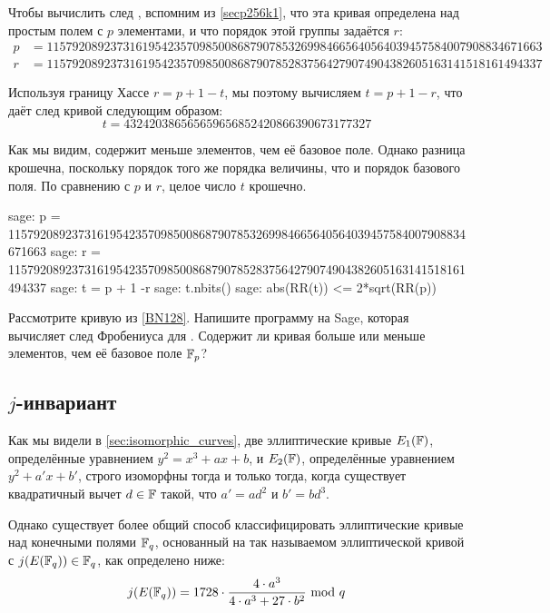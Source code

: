 \begin{example}\label{ex:secp256k1-trace}Чтобы вычислить след , вспомним из \examplename{} \ref{secp256k1}, что эта кривая определена над простым полем с $p$ элементами, и что порядок этой группы задаётся $r$:  
\begin{align*}
p &= \scriptstyle 115792089237316195423570985008687907853269984665640564039457584007908834671663\\
r &= \scriptstyle 115792089237316195423570985008687907852837564279074904382605163141518161494337
\end{align*}

Используя границу Хассе $r = p + 1 -t$, мы поэтому вычисляем $t= p+1 -r$, что даёт след кривой  следующим образом:
$$
t = \scriptstyle 432420386565659656852420866390673177327
$$

Как мы видим,  содержит меньше элементов, чем её базовое поле. Однако разница крошечна, поскольку порядок  того же порядка величины, что и порядок базового поля. По сравнению с $p$ и $r$, целое число $t$ крошечно.

\begin{sagecommandline}
sage: p = 115792089237316195423570985008687907853269984665640564039457584007908834671663
sage: r = 115792089237316195423570985008687907852837564279074904382605163141518161494337
sage: t = p + 1 -r
sage: t.nbits()
sage: abs(RR(t)) <= 2*sqrt(RR(p))
\end{sagecommandline}
\end{example} 
\begin{exercise}
\label{exercise:BN128-trace}
Рассмотрите кривую  из \examplename{} \ref{BN128}. Напишите программу на Sage, которая вычисляет след Фробениуса для . Содержит ли кривая больше или меньше элементов, чем её базовое поле $\mathbb{F}_p$?
\end{exercise}

\subsection{$j$-инвариант}
\label{sec:j-inv} Как мы видели в \ref{sec:isomorphic_curves}, две эллиптические кривые $E_1(\mathbb{F})$, определённые уравнением $y^2 = x^3 + ax +b$, и $E_2(\mathbb{F})$, определённые уравнением $y^2 + a'x + b'$, строго изоморфны тогда и только тогда, когда существует квадратичный вычет $d\in \mathbb{F}$ такой, что $a' = a d^2$ и $b' = b d^3$. 

Однако существует более общий способ классифицировать эллиптические кривые над конечными полями $\mathbb{F}_q$, основанный на так называемом  эллиптической кривой с $j(E(\mathbb{F}_q))\in\mathbb{F}_q$, как определено ниже:
\begin{equation}\label{eq:j-invariant1}
j(E(\mathbb{F}_q)) = 1728\cdot \frac{4\cdot a^3}{4\cdot a^3+ 27\cdot b^2} \text{ mod } q
\end{equation}

